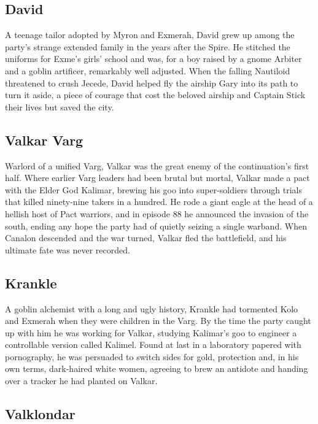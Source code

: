 \subsection*{David}

\noindent

A teenage tailor adopted by Myron and Exmerah, David grew up among the party's strange extended family in the years after the Spire.  He stitched the uniforms for Exme's girls' school and was, for a boy raised by a gnome Arbiter and a goblin artificer, remarkably well adjusted.  When the falling Nautiloid threatened to crush Jecede, David helped fly the airship Gary into its path to turn it aside, a piece of courage that cost the beloved airship and Captain Stick their lives but saved the city.

\subsection*{Valkar Varg}

\noindent

Warlord of a unified Varg, Valkar was the great enemy of the continuation's first half.  Where earlier Varg leaders had been brutal but mortal, Valkar made a pact with the Elder God Kalimar, brewing his goo into super-soldiers through trials that killed ninety-nine takers in a hundred.  He rode a giant eagle at the head of a hellish host of Pact warriors, and in episode 88 he announced the invasion of the south, ending any hope the party had of quietly seizing a single warband.  When Canalon descended and the war turned, Valkar fled the battlefield, and his ultimate fate was never recorded.

\subsection*{Krankle}

\noindent

A goblin alchemist with a long and ugly history, Krankle had tormented Kolo and Exmerah when they were children in the Varg.  By the time the party caught up with him he was working for Valkar, studying Kalimar's goo to engineer a controllable version called Kalimel.  Found at last in a laboratory papered with pornography, he was persuaded to switch sides for gold, protection and, in his own terms, dark-haired white women, agreeing to brew an antidote and handing over a tracker he had planted on Valkar.

\subsection*{Valklondar}

